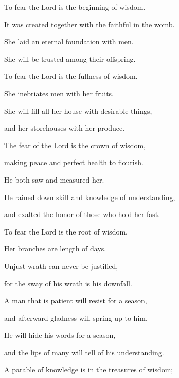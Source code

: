 {\par }{\Q {}To fear the Lord is the beginning of wisdom.
\par }{\QB It was created together with the faithful in the womb.
\par }{\Q {}She
 laid an eternal foundation with men.
\par }{\QB She will be trusted among their offspring.
\par }{\Q {}To fear the Lord is the fullness of wisdom.
\par }{\QB She inebriates men with her fruits.
\par }{\Q {}She will fill all her house with desirable things,
\par }{\QB and her storehouses with her produce.
\par }{\Q {}The fear of the Lord is the crown of wisdom,
\par }{\QB making peace and
 perfect health to flourish.
\par }{\Q {}He both saw and measured her.
\par }{\QB He rained down skill and knowledge of understanding,
\par }{\QB and exalted the honor of those who hold her fast.
\par }{\Q {}To fear the Lord is the root of wisdom.
\par }{\QB Her branches are length of days.
\par }{\BB \par }{\Q {}Unjust wrath can never be justified,
\par }{\QB for the sway of his wrath is his downfall.
\par }{\Q {}A man that is patient will resist for a season,
\par }{\QB and afterward gladness will spring up to him.
\par }{\Q {}He will hide his words for a season,
\par }{\QB and the lips of many will tell of his understanding.
\par }{\Q {}A parable of knowledge is in the treasures of wisdom;
}
